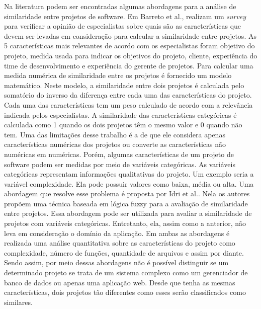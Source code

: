 Na literatura podem ser encontradas algumas abordagens para a análise de similaridade entre projetos de software. Em \cite{barreto2010analyzing} Barreto et al., realizam um \textit{survey} para verificar a opinião de especialistas sobre quais são as características que devem ser levadas em consideração para calcular a similaridade entre projetos. As 5 características mais relevantes de acordo com os especialistas foram objetivo do projeto, medida usada para indicar os objetivos do projeto, cliente, experiência do time de desenvolvimento e experiência do gerente de projetos. 
Para calcular uma medida numérica de similaridade entre os projetos é fornecido um modelo matemático. Neste modelo, a similaridade entre dois projetos é calculada pelo somatório do inverso da diferença entre cada uma das características do projeto. Cada uma das características tem um peso calculado de acordo com a relevância indicada pelos especialistas. A similaridade das características categóricas é calculada como 1 quando os dois projetos têm o mesmo valor e 0 quando não tem. Uma das limitações desse trabalho é a de que ele considera apenas características numéricas dos projetos ou converte as características não numéricas em numéricas. Porém, algumas características de um projeto de software podem ser medidas por meio de variáveis categóricas. As variáveis categóricas representam informações qualitativas do projeto. Um exemplo seria a variável complexidade. Ela pode possuir valores como baixa, média ou alta. Uma abordagem que resolve esse problema é proposta por  Idri et al.\cite{idri2001fuzzy}. Nela os autores propõem uma técnica baseada em lógica fuzzy para a avaliação de similaridade entre projetos. Essa abordagem pode ser utilizada para avaliar a similaridade de projetos com variáveis categóricas. Entretanto, ela, assim como a anterior, não leva em consideração o domínio da aplicação. Em ambas as abordagens é realizada uma análise quantitativa sobre as características do projeto como complexidade, número de funções, quantidade de arquivos e assim por diante. Sendo assim, por meio dessas abordagens não é possível distinguir se um determinado projeto se trata de um sistema complexo como um gerenciador de banco de dados ou apenas uma aplicação web. Desde que tenha as mesmas características, dois projetos tão diferentes como esses serão classificados como similares.

